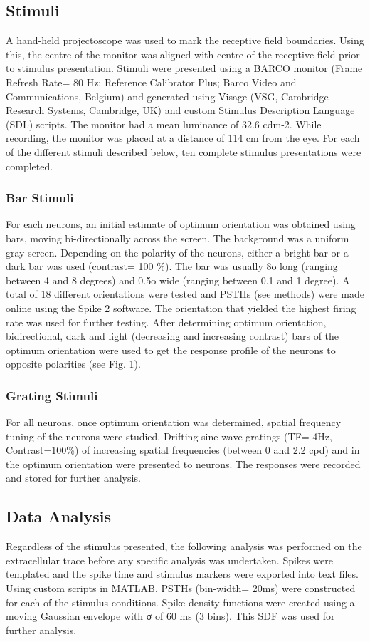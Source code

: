 		\subsection{Stimuli}
		A hand-held projectoscope was used to mark the receptive field boundaries. Using this, the centre of the monitor was aligned with centre of the receptive field prior to stimulus presentation. Stimuli were presented using a BARCO monitor (Frame Refresh Rate= 80 Hz; Reference Calibrator Plus; Barco Video and Communications, Belgium) and generated using Visage (VSG, Cambridge Research Systems, Cambridge, UK) and custom Stimulus Description Language (SDL) scripts. The monitor had a mean luminance of 32.6 cdm-2. While recording, the monitor was placed at a distance of 114 cm from the eye. For each of the different stimuli described below, ten complete stimulus presentations were completed.
				\subsubsection{Bar Stimuli}
				For each neurons, an initial estimate of optimum orientation was obtained using bars, moving bi-directionally across the screen. The background was a uniform gray screen. Depending on the polarity of the neurons, either a bright bar or a dark bar was used (contrast= 100 \%). The bar was usually 8o long (ranging between 4 and 8 degrees) and 0.5o wide (ranging between 0.1 and 1 degree). A total of 18 different orientations were tested and PSTHs (see methods) were made online using the Spike 2 software. The orientation that yielded the highest firing rate was used for further testing.
				After determining optimum orientation, bidirectional, dark and light (decreasing and increasing contrast) bars of the optimum orientation were used to get the response profile of the neurons to opposite polarities (see Fig. 1). 
				\subsubsection{Grating Stimuli}
				For all neurons, once optimum orientation was determined, spatial frequency tuning of the neurons were studied. Drifting sine-wave gratings (TF= 4Hz, Contrast=100\%) of increasing spatial frequencies (between 0 and 2.2 cpd) and in the optimum orientation were presented to neurons. The responses were recorded and stored for further analysis.
				
   		\subsection{Data Analysis}
		Regardless of the stimulus presented, the following analysis was performed on the extracellular trace before any specific analysis was undertaken. Spikes were templated and the spike time and stimulus markers were exported into text files. Using custom scripts in MATLAB, PSTHs (bin-width= 20ms) were constructed for each of the stimulus conditions.  Spike density functions were created using a moving Gaussian envelope with σ of 60 ms (3 bins). This SDF was used for further analysis. 
